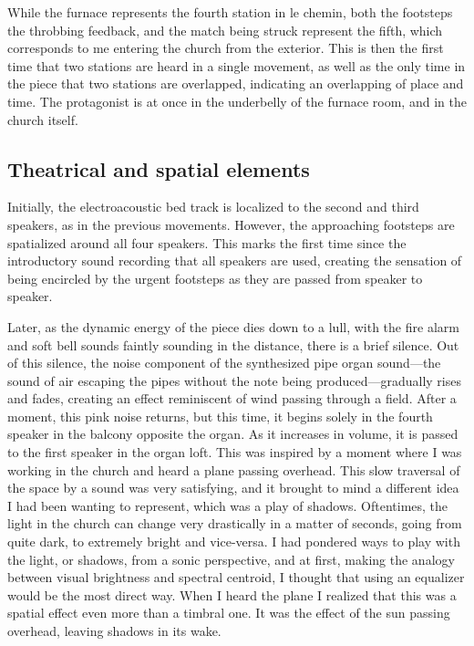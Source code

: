 \documentclass[12pt,twoside,maitrise]{dms_ks}
\theoremstyle{definition}
\begin{document}
{While the furnace represents the fourth station in le chemin, both the footsteps the throbbing feedback, and the match being struck represent the fifth, which corresponds to me entering the church from the exterior. 
This is then the first time that two stations are heard in a single movement, as well as the only time in the piece that two stations are overlapped, indicating an overlapping of place and time. 
The protagonist is at once in the underbelly of the furnace room, and in the church itself. 


\subsection{Theatrical and spatial elements}

Initially, the electroacoustic bed track is localized to the second and third speakers, as in the previous movements. 
However, the approaching footsteps are spatialized around all four speakers. 
This marks the first time since the introductory sound recording that all speakers are used, creating the sensation of being encircled by the urgent footsteps as they are passed from speaker to speaker.

Later, as the dynamic energy of the piece dies down to a lull, with the fire alarm and soft bell sounds faintly sounding in the distance, there is a brief silence. 
Out of this silence, the noise component of the synthesized pipe organ sound---the sound of air escaping the pipes without the note being produced---gradually rises and fades, creating an effect reminiscent of wind passing through a field. 
After a moment, this pink noise returns, but this time, it begins solely in the fourth speaker in the balcony opposite the organ. 
As it increases in volume, it is passed to the first speaker in the organ loft. 
This was inspired by a moment where I was working in the church and heard a plane passing overhead. 
This slow traversal of the space by a sound was very satisfying, and it brought to mind a different idea I had been wanting to represent, which was a play of shadows. 
Oftentimes, the light in the church can change very drastically in a matter of seconds, going from quite dark, to extremely bright and vice-versa. 
I had pondered ways to play with the light, or shadows, from a sonic perspective, and at first, making the analogy between visual brightness and spectral centroid, I thought that using an equalizer would be the most direct way. 
When I heard the plane I realized that this was a spatial effect even more than a timbral one. 
It was the effect of the sun passing overhead, leaving shadows in its wake.

}
\end{document}

